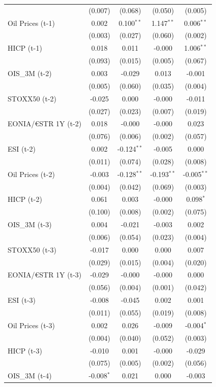 \begin{longtable}[t]{lcccc}
 & (0.007) & (0.068) & (0.050) & (0.005)\\
Oil Prices (t-1) & 0.002 & 0.100$^{**}$ & 1.147$^{**}$ & 0.006$^{**}$\\
 & (0.003) & (0.027) & (0.060) & (0.002)\\
HICP (t-1) & 0.018 & 0.011 & -0.000 & 1.006$^{**}$\\
 & (0.093) & (0.015) & (0.005) & (0.067)\\
OIS\_3M (t-2) & 0.003 & -0.029 & 0.013 & -0.001\\
 & (0.005) & (0.060) & (0.035) & (0.004)\\
STOXX50 (t-2) & -0.025 & 0.000 & -0.000 & -0.011\\
 & (0.027) & (0.023) & (0.007) & (0.019)\\
EONIA/€STR 1Y (t-2) & 0.018 & -0.000 & -0.000 & 0.023\\
 & (0.076) & (0.006) & (0.002) & (0.057)\\
ESI (t-2) & 0.002 & -0.124$^{**}$ & -0.005 & 0.000\\
 & (0.011) & (0.074) & (0.028) & (0.008)\\
Oil Prices (t-2) & -0.003 & -0.128$^{**}$ & -0.193$^{**}$ & -0.005$^{**}$\\
 & (0.004) & (0.042) & (0.069) & (0.003)\\
HICP (t-2) & 0.061 & 0.003 & -0.000 & 0.098$^{*}$\\
 & (0.100) & (0.008) & (0.002) & (0.075)\\
OIS\_3M (t-3) & 0.004 & -0.021 & -0.003 & 0.002\\
 & (0.006) & (0.054) & (0.023) & (0.004)\\
STOXX50 (t-3) & -0.017 & 0.000 & 0.000 & 0.007\\
 & (0.029) & (0.015) & (0.004) & (0.020)\\
EONIA/€STR 1Y (t-3) & -0.029 & -0.000 & -0.000 & 0.000\\
 & (0.056) & (0.004) & (0.001) & (0.042)\\
ESI (t-3) & -0.008 & -0.045 & 0.002 & 0.001\\
 & (0.011) & (0.055) & (0.019) & (0.008)\\
Oil Prices (t-3) & 0.002 & 0.026 & -0.009 & -0.004$^{*}$\\
 & (0.004) & (0.040) & (0.052) & (0.003)\\
HICP (t-3) & -0.010 & 0.001 & -0.000 & -0.029\\
 & (0.075) & (0.005) & (0.002) & (0.056)\\
OIS\_3M (t-4) & -0.008$^{*}$ & 0.021 & 0.000 & -0.003\\

\end{longtable}
